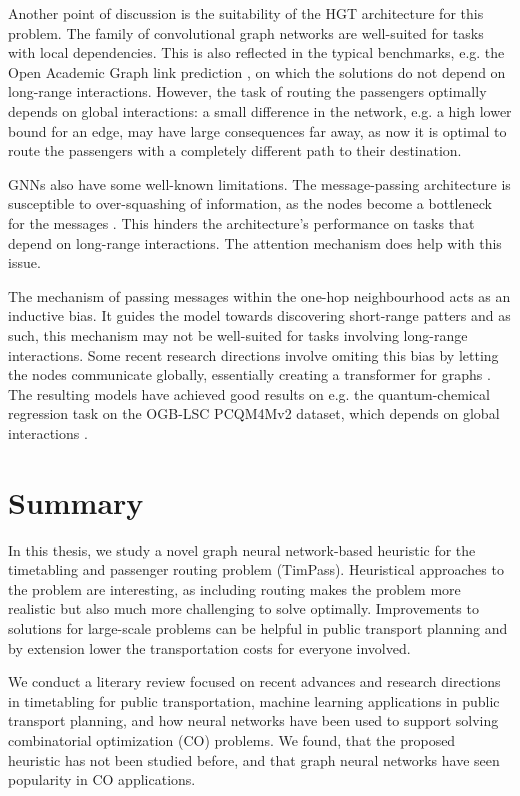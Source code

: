 \documentclass[english, 12pt, a4paper, sci, utf8, a-2b, online]{aaltothesis}
\begin{document}
Another point of discussion is the suitability of the HGT architecture for this problem. The family of convolutional graph networks are well-suited for tasks with local dependencies. This is also reflected in the typical benchmarks, e.g. the Open Academic Graph link prediction \cite{oag-dataset}, on which the solutions do not depend on long-range interactions. However, the task of routing the passengers optimally depends on global interactions: a small difference in the network, e.g. a high lower bound for an edge, may have large consequences far away, as now it is optimal to route the passengers with a completely different path to their destination.

GNNs also have some well-known limitations. The message-passing architecture is susceptible to over-squashing of information, as the nodes become a bottleneck for the messages \cite{alon2020bottleneck}. This hinders the architecture's performance on tasks that depend on long-range interactions. The attention mechanism does help with this issue.

The mechanism of passing messages within the one-hop neighbourhood acts as an inductive bias. It guides the model towards discovering short-range patters and as such, this mechanism may not be well-suited for tasks involving long-range interactions. Some recent research directions involve omiting this bias by letting the nodes communicate globally, essentially creating a transformer for graphs \cite{ying2021transformers,hussain2022global}. The resulting models have achieved good results on e.g. the quantum-chemical
regression task on the OGB-LSC PCQM4Mv2 dataset, which depends on global interactions \cite{hu2021ogblsc}.


\clearpage
\section{Summary}
\label{sec:summary}

In this thesis, we study a novel graph neural network-based heuristic for the timetabling and passenger routing problem (TimPass). Heuristical approaches to the problem are interesting, as including routing makes the problem more realistic but also much more challenging to solve optimally. Improvements to solutions for large-scale problems can be helpful in public transport planning and by extension lower the transportation costs for everyone involved.

We conduct a literary review focused on recent advances and research directions in timetabling for public transportation, machine learning applications in public transport planning, and how neural networks have been used to support solving combinatorial optimization (CO) problems. We found, that the proposed heuristic has not been studied before, and that graph neural networks have seen popularity in CO applications.
\end{document}
